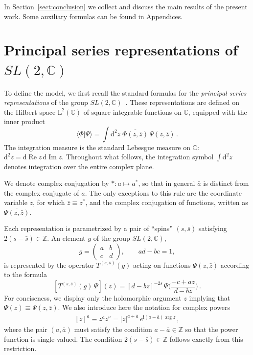 \documentclass[a4paper,11pt]{article}
\renewcommand{\imath}{\mathrm{i}}
\renewcommand{\Re}{\operatorname{Re}}
\renewcommand{\Im}{\operatorname{Im}}
\numberwithin{equation}{section}
\begin{document}
In Section~\ref{sect:conclusion} we collect and discuss the main results of the present work. Some auxiliary formulas can be found in Appendices.
 


\section{Principal series representations of $SL(2,\mathbb{C})$} \label{sect:Rep}

To define the model, we first recall the standard formulas for the \textit{principal series representations} of the group $SL(2,\mathbb{C})$~\cite[Ch.~III]{GGV}.
These representations are defined on the Hilbert space $\mathrm{L}^2(\mathbb{C})$ of square-integrable functions on $\mathbb{C}$, equipped with the inner product
\begin{equation} \label{sp}
    \langle \Phi|\Psi\rangle = \int \mathrm{d}^2z \; \overline{\Phi(z,\bar{z})}\,\Psi(z, \bar{z}) \,.
\end{equation}
The integration measure is the standard Lebesgue measure on $\mathbb{C}$: $\mathrm{d}^2 z = \mathrm{d}\Re z \,\mathrm{d}\Im z$. Throughout what follows, the integration symbol $\int \mathrm{d}^2z$ denotes integration over the entire complex plane.

We denote complex conjugation by $*: a \mapsto a^*$, so that in general $\bar{a}$ is distinct from the complex conjugate of $a$.
The only exceptions to this rule are the coordinate variable $z$, for which $\bar{z} \equiv z^*$, and the complex conjugation of functions, written as $\overline{\Psi(z, \bar{z})}$. 

Each representation is parametrized by a pair of ``spins'' $(s, \bar{s})$ satisfying $2(s - \bar{s}) \in \mathbb{Z}$.
An element $g$ of the group $SL(2,\mathbb{C})$,
\begin{equation} \nonumber
    g =
    \begin{pmatrix}
        a & b \\
        c & d
    \end{pmatrix}, \qquad ad - bc = 1,
\end{equation}
is represented by the operator $T^{(s,\bar{s})}(g)$ acting on functions $\Psi(z, \bar{z})$ according to the formula
\begin{equation} \nonumber
    [T^{(s,\bar{s})}(g) \, \Psi] (z) =
    [d-bz]^{-2s} \, \Psi \biggl(\frac{-c+az}{d-bz}\biggr) \,.
\end{equation}  
For conciseness, we display only the holomorphic argument $z$ implying that $\Psi(z) \equiv \Psi(z, \bar{z})$.
We also introduce here the notation for complex powers
\begin{align} \label{power}
    [z]^a \equiv z^a \bar{z}^{\bar{a}} = |z|^{a+\bar{a}} \, {e}^{\imath(a-\bar{a}) \arg z} \,,
\end{align}
where the pair $(a,\bar{a})$ must satisfy the condition $a-\bar{a} \in\mathbb{Z}$ so that the power function is single-valued.
The condition $2(s - \bar{s}) \in \mathbb{Z}$ follows exactly from this restriction.
\end{document}
